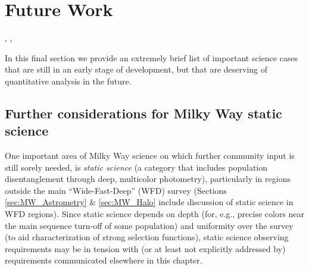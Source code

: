 %
%

\section{Future Work}
\def\secname{MW_future}\label{sec:\secname}


% 



% 



, , 

In this final section we provide an extremely brief list of important science
cases that are still in an early stage of development, but that are
deserving of quantitative \MAF analysis in the future.

\subsection{Further considerations for Milky Way static science}

  One important area of Milky Way science on which further
  community input is still sorely needed, is {\it static science} (a
  category that includes population disentanglement through deep,
  multicolor photometry), particularly in regions outside the main
  ``Wide-Fast-Deep'' (WFD) survey (Sections \ref{sec:MW_Astrometry} \&
  \ref{sec:MW_Halo} include discussion of static science in WFD regions). Since
  static science depends on depth (for, e.g., precise colors near the
  main sequence turn-off of some population) and uniformity over the
  survey (to aid characterization of strong selection functions),
  static science observing requirements may be in tension with (or at
  least not explicitly addressed by) requirements communicated
  elsewhere in this chapter.

